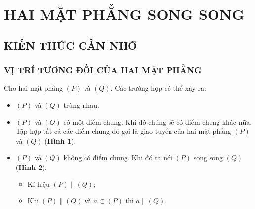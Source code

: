 \FULLWIDTH
\section{HAI MẶT PHẲNG SONG SONG}
\subsection{KIẾN THỨC CẦN NHỚ}

\subsubsection{VỊ TRÍ TƯƠNG ĐỐI CỦA HAI MẶT PHẲNG}
Cho hai mặt phẳng $(P)$ và $(Q)$. Các trường hợp có thể xảy ra:
\begin{itemize}
	\item [\iconCH]  $(P)$ và $(Q)$ trùng nhau.
	\item [\iconCH]  $(P)$ và $(Q)$ có một điểm chung. Khi đó chúng sẽ có điểm chung khác nữa. Tập hợp tất cả các điểm chung đó gọi là  giao tuyến của hai mặt phẳng $(P)$ và $(Q)$ (\textbf{Hình 1}).
	\item [\iconCH]  $(P)$ và $(Q)$ không có điểm chung. Khi đó ta nói $(P)$ song song $(Q)$ (\textbf{Hình 2}).
	\begin{itemize}
		\item Kí hiệu $(P)\parallel (Q)$;
		\item Khi $(P)\parallel (Q)$ và $a \subset (P)$ thì $a \parallel (Q)$.
	\end{itemize}
\end{itemize}
